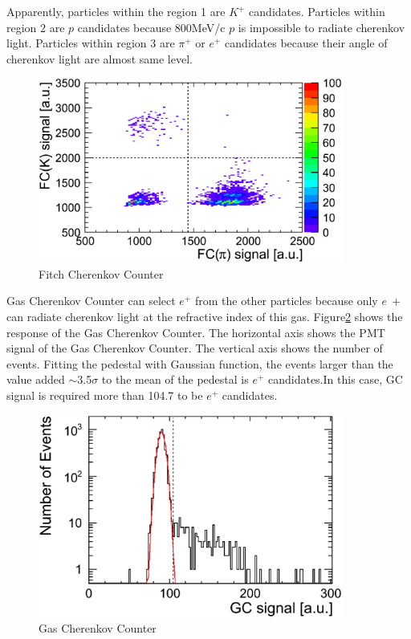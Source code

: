 Apparently, particles within the region 1 are $K^{+}$ candidates.
Particles within region 2 are $p$ candidates because 800MeV/c $p$ is impossible to radiate cherenkov light.
Particles within region 3 are $\pi^{+}$ or $e^{+}$ candidates because their angle of cherenkov light are almost same level.\\

\begin{figure}[htbp]
  \centering
  \includegraphics[width=10cm,clip]{fig/FC_KPI.eps}
  \caption{Fitch Cherenkov Counter}
  \label{fig:FC_KPI}
\end{figure}

Gas Cherenkov Counter can select $e^{+}$ from the other particles because only $e~{+}$ can radiate cherenkov light at the refractive index of this gas.
Figure\ref{fig:GC} shows the response of the Gas Cherenkov Counter.
The horizontal axis shows the PMT signal of the Gas Cherenkov Counter.
The vertical axis shows the number of events.
Fitting the pedestal with Gaussian function,
the events larger than the value added $\sim$3.5$\sigma$ to the mean of the pedestal is $e^{+}$ candidates.In this case, GC signal is required more than 104.7 to be $e^{+}$ candidates.\\

\begin{figure}[htbp]
  \centering
  \includegraphics[width=10cm,clip]{fig/GC.eps}
  \caption{Gas Cherenkov Counter}
  \label{fig:GC}
\end{figure}

